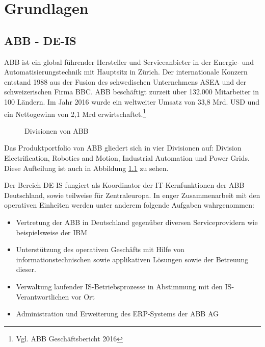 
\chapter{Grundlagen}
\label{ch:Grundlagen}


\section{ABB - DE-IS}

ABB ist ein global f\"{u}hrender Hersteller und Serviceanbieter in der Energie- und Automatisierungstechnik mit Hauptsitz in Z\"{u}rich.
Der internationale Konzern entstand 1988 aus der Fusion des schwedischen Unternehmens \ac{ASEA} und der schweizerischen Firma \ac{BBC}. ABB besch\"{a}ftigt zurzeit \"{u}ber 132.000 Mitarbeiter in 100 L\"{a}ndern. Im Jahr 2016 wurde ein weltweiter Umsatz von 33,8 Mrd. USD und ein Nettogewinn von 2,1 Mrd erwirtschaftet.\footnote{Vgl. ABB Gesch\"{a}ftsbericht 2016} 
\linebreak



\begin{figure}[ht]
	\centering
	
	\caption{Divisionen von ABB}
	\label{fig1}
	
\end{figure}

Das Produktportfolio von ABB gliedert sich in vier Divisionen auf: Division Electrification, Robotics and Motion, Industrial Automation und Power Grids. Diese Aufteilung ist auch in Abbildung \ref{fig1} zu sehen.

Der Bereich \ac{DE-IS} fungiert als Koordinator der IT-Kernfunktionen der ABB Deutschland, sowie teilweise für Zentraleuropa. In enger Zusammenarbeit mit den operativen Einheiten werden unter anderem folgende Aufgaben wahrgenommen:

\begin{itemize}
	\item Vertretung der ABB in Deutschland gegenüber diversen Serviceprovidern wie beispielsweise der IBM
	\item Unterstützung des operativen Geschäfts mit Hilfe von informationstechnischen sowie applikativen  Lösungen sowie der Betreuung dieser.
	\item Verwaltung laufender IS-Betriebsprozesse in Abstimmung mit den IS-Verantwortlichen vor Ort
	\item Administration und Erweiterung des \ac{ERP}-Systems der ABB AG
\end{itemize}


